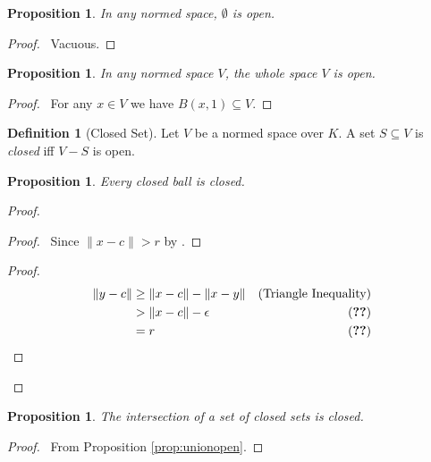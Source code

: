 \documentclass{book}
\let\qed\relax
\newtheorem{prop}[ax]{Proposition}
\theoremstyle{definition}
\newtheorem{df}[ax]{Definition}
\begin{document}
\begin{prop}
In any normed space, $\emptyset$ is open.
\end{prop}

\begin{proof}
\pf\ Vacuous. \qed
\end{proof}

\begin{prop}
In any normed space $V$, the whole space $V$ is open.
\end{prop}

\begin{proof}
\pf\ For any $x \in V$ we have $B(x,1) \subseteq V$. \qed
\end{proof}

\begin{df}[Closed Set]
Let $V$ be a normed space over $K$. A set $S \subseteq V$ is \emph{closed} iff $V - S$ is open.
\end{df}

\begin{prop}
Every closed ball is closed.
\end{prop}

\begin{proof}
\pf
{}
\begin{proof}
	\pf\ Since $\|x-c\| > r$ by .
\end{proof}
\begin{proof}
	\pf
	\begin{align*}
	\|y-c\| & \geq \|x-c\| - \|x-y\| & (\text{Triangle Inequality}) \\
	& > \|x-c\| - \epsilon & (\text{\stepref{6}}) \\
	& = r & (\text{\stepref{4}})
	\end{align*}
\end{proof}
\qed
\end{proof}

\begin{prop}
\label{prop:closedint}
The intersection of a set of closed sets is closed.
\end{prop}

\begin{proof}
\pf\ From Proposition \ref{prop:unionopen}. \qed
\end{proof}
\end{document}
